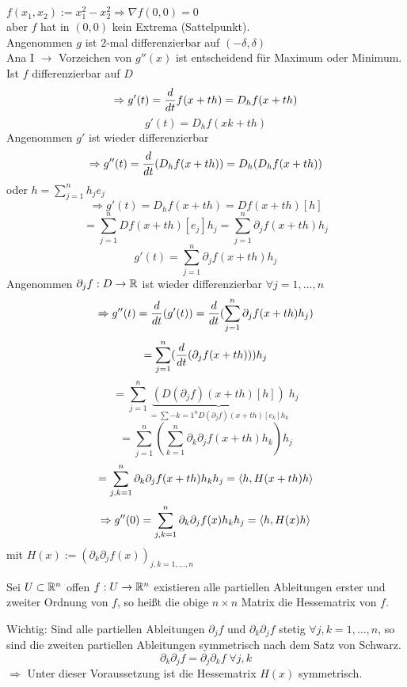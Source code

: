 \documentclass[../ana2.tex]{subfiles}
\begin{document}
\begin{bsp}
    \(f(x_1, x_2) := x_1^2 - x_2^2 \Rightarrow \nabla f(0, 0) = 0\)\\
    aber \(f\) hat in \((0,0)\) kein Extrema (Sattelpunkt).\\
    Angenommen \(g\) ist \(2\)-mal differenzierbar auf \((-\delta, \delta)\)\\
    Ana I \(\rightarrow\) Vorzeichen von \(g''(x)\) ist entscheidend für 
    Maximum oder Minimum.\\
    Ist \(f\) differenzierbar auf \(D\)
    \[ \Rightarrow g'(t) = \frac{d}{dt} f(x+th) = D_hf(x+th) \]
    \[ g'(t) = D_h f(xk+th) \]
    Angenommen \(g'\) ist wieder differenzierbar
    \[ \Rightarrow g''(t) = \frac{d}{dt} (D_hf(x+th)) = D_h(D_hf(x+th)) \]
    oder \( h = \sum_{j=1}^n h_j e_j \)
    \[ \Rightarrow g'(t) = D_hf(x+th) = Df(x+th)[h] \]
    \[ = \sum_{j=1}^n Df(x+th)[e_j]h_j = \sum_{j=1}^n \partial_j f(x+th)h_j \]
    \[ g'(t) = \sum_{j=1}^n \partial_j f(x+th) h_j \]
    Angenommen \( \partial_j f:D\rightarrow \mathbb{R} \) ist wieder differenzierbar \(\forall j=1, \ldots, n\)
    \[ \Rightarrow g''(t) = \frac{d}{dt} (g'(t)) = \frac{d}{dt} (\sum_{j=1}^n \partial_j f(x+th)h_j) \]
    \[ = \sum_{j=1}^n  (\frac{d}{dt}(\partial_j f(x+th)))h_j\]
    \[ = \sum_{j=1}^n 
    \underbrace{(D(\partial_j f)(x+th)[h])}_{= \sum-{k=1}^n D(\partial_jf)(x+th)[e_k]h_k} h_j \]
    \[ = \sum_{j=1}^n ( \sum_{k=1}^n \partial_k \partial_j f(x+th)h_k)h_j \]
    \[ = \sum_{j,k = 1}^n \partial_k \partial_j f(x+th)h_k h_j = \langle h, H(x+th)h \rangle \]
    \[ \Rightarrow g''(0) = \sum_{j,k = 1}^n \partial_k \partial_j f(x) h_k h_j 
    = \langle h, H(x)h \rangle \]
    mit \(H(x) := (\partial_k \partial_j f(x))_{j,k=1,\ldots,n} \) 
\end{bsp}
\begin{defi}
    Sei \(U \subset \mathbb{R}^n\) offen \(f:U\rightarrow \mathbb{R}^n\) existieren alle partiellen Ableitungen
    erster und zweiter Ordnung von \(f\), so heißt die obige \(n\times n\) Matrix die Hessematrix 
    von \(f\).
\end{defi}
Wichtig: Sind alle partiellen Ableitungen \(\partial_j f\) und 
\( \partial_k \partial_j f \)
stetig \(\forall j,k = 1, \ldots , n\), so sind die zweiten partiellen Ableitungen symmetrisch
nach dem Satz von Schwarz.
\[ \partial_k \partial_j f = \partial_j \partial_k f \; \forall j,k \]
\(\Rightarrow\) Unter dieser Voraussetzung ist die Hessematrix \(H(x)\) symmetrisch.
\end{document}
